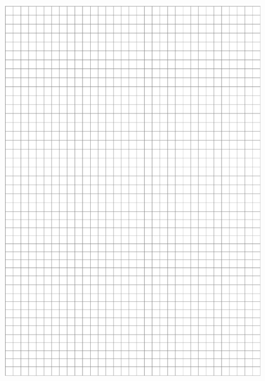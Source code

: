 \documentclass[10pt]{article}
\begin{document}
\includegraphics[max width=\textwidth, center]{2024_11_21_832f1bc2b626663f1df2g-15}
\end{document}

